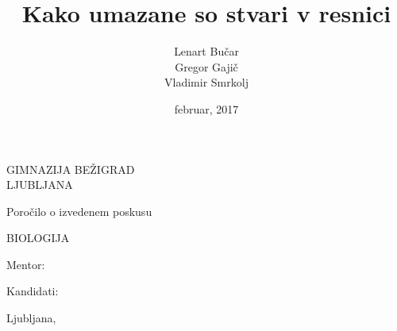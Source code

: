 \documentclass[12pt, a4paper]{report}
\begin{document}
\title{Kako umazane so stvari v resnici}
\author{Lenart Bučar\\Gregor Gajič\\Vladimir Smrkolj}
\date{februar, 2017}

\begin{titlepage}
\centering
{\sffamily

{\Large{GIMNAZIJA BEŽIGRAD\\[2mm]LJUBLJANA}}

\vspace{2.5cm}

{\large Poročilo o izvedenem poskusu

\vspace{1cm}

BIOLOGIJA
}

\vspace{2.5cm}

\makeatletter
{\LARGE{\textbf{\@title}}}
\makeatother


\vfill


\parbox{4cm}{Mentor:}
\hfill
\makeatletter
Kandidati: \parbox[t]{4cm}{\@author}
\makeatother

\vspace{2cm}

\makeatletter
Ljubljana, \@date
\makeatother
}
\end{titlepage}
\end{document}

